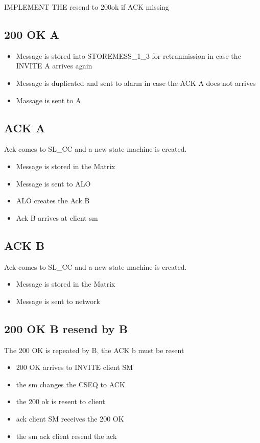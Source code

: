 \documentclass[a4paper]{article}
\begin{document}
IMPLEMENT THE resend to 200ok if ACK missing

\subsection{200 OK A}
\begin {itemize}
\item Message is stored into STOREMESS\_1\_3 for retranmission in case the INVITE A arrives again
\item Message is duplicated and sent to alarm in case the ACK A does not arrives
\item Massage is sent to A
\end{itemize}

\subsection{ACK A}
Ack comes to SL\_CC and a new state machine is created.
\begin {itemize}
\item Message is stored in the Matrix 
\item Message is sent to ALO
\item ALO creates the Ack B
\item Ack B arrives at client sm
\end{itemize}

\subsection{ACK B}
Ack comes to SL\_CC and a new state machine is created.
\begin {itemize}
\item Message is stored in the Matrix 
\item Message is sent to network
\end{itemize}

\subsection{200 OK B resend by B}
The 200 OK is repeated by B, the ACK b must be resent
\begin{itemize}
\item 200 OK arrives to INVITE client SM
\item the sm changes the CSEQ to ACK
\item the 200 ok is resent to client
\item ack client SM receives the 200 OK
\item the sm ack client resend the ack
\end{itemize}
\end{document}
